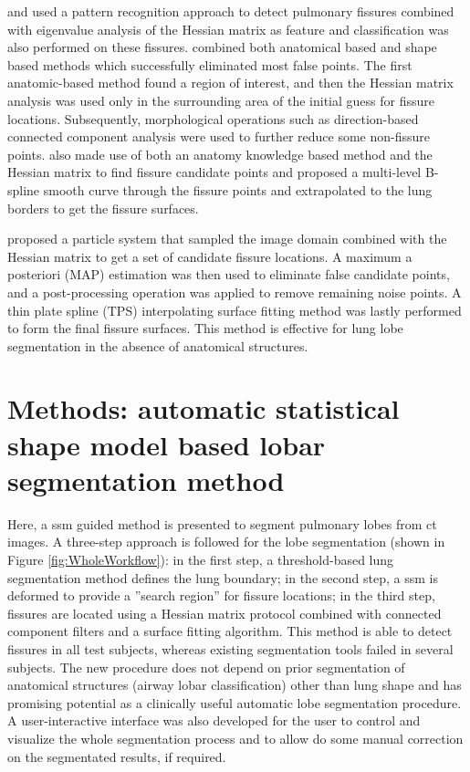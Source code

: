 \cite{ochs2007automated} and \cite{van2008supervised} used a pattern recognition approach to detect pulmonary fissures combined with eigenvalue analysis of the Hessian matrix as feature and classification was also performed on these fissures. \cite{lassen2011interactive,lassen2013automatic} combined both anatomical based and shape based methods which successfully eliminated most false points. The first anatomic-based method found a region of interest, and then the Hessian matrix analysis was used only in the surrounding area of the initial guess for fissure locations. Subsequently, morphological operations such as direction-based connected component analysis were used to further reduce some non-fissure points. \cite{doel2012pulmonary} also made use of both an anatomy knowledge based method and the Hessian matrix to find fissure candidate points and proposed a multi-level B-spline smooth curve through the fissure points and extrapolated to the lung borders to get the fissure surfaces.

\cite{ross2010automatic, ross2013pulmonary} proposed a particle system that sampled the image domain combined with the Hessian matrix to get a set of candidate fissure locations. A maximum a posteriori (MAP) estimation was then used to eliminate false candidate points, and a post-processing operation was applied to remove remaining noise points. A thin plate spline (TPS) interpolating surface fitting method was lastly performed to form the final fissure surfaces. This method is effective for lung lobe segmentation in the absence of anatomical structures.

\section{Methods: automatic statistical shape model based lobar segmentation method} \label{SegmentationMethod}
Here, a \gls{ssm} guided method is presented to segment pulmonary lobes from \gls{ct} images. A three-step approach is followed for the lobe segmentation (shown in Figure \ref{fig:WholeWorkflow}): in the first step, a threshold-based lung segmentation method defines the lung boundary; in the second step, a \gls{ssm} is deformed to provide a ''search region'' for fissure locations; in the third step, fissures are located using a Hessian matrix protocol combined with connected component filters and a surface fitting algorithm. This method is able to detect fissures in all test subjects, whereas existing segmentation tools failed in several subjects. The new procedure does not depend on prior segmentation of anatomical structures (airway lobar classification) other than lung shape and has promising potential as a clinically useful automatic lobe segmentation procedure. A user-interactive interface was also developed for the user to control and visualize the whole segmentation process and to allow do some manual correction on the segmentated results, if required.
\newpage

